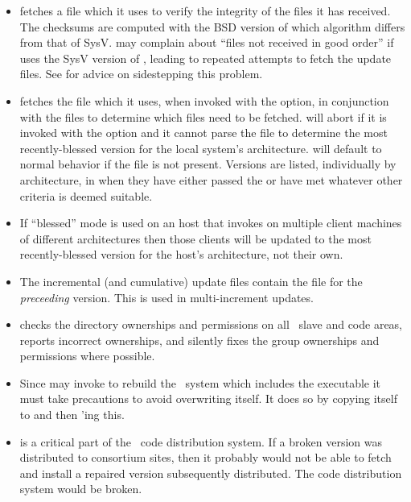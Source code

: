 \begin{itemize}
\item
    fetches a  file which it uses to verify the
   integrity of the files it has received.  The checksums are computed with
   the BSD version of  which algorithm differs from that of SysV.
    may complain about ``files not received in good order'' if 
    uses the SysV version of , leading to repeated
   attempts to fetch the update files.  See 
   for advice on sidestepping this problem.

\item
    fetches the file  which it
   uses, when invoked with the  option, in conjunction with the
    files to determine which files need to be fetched.
    will abort if it is invoked with the  option and
   it cannot parse the  file to determine the most
   recently-blessed version for the local system's architecture.
    will default to normal behavior if the 
   file is not present.  Versions are listed, individually by
   architecture, in  when they have either passed the
    or have met whatever other criteria is deemed
   suitable.

\item
   If ``blessed'' mode is used on an  host that invokes
    on multiple client machines of different
   architectures then those clients will be updated to the most
   recently-blessed version for the  host's architecture,
   not their own.

\item
   The incremental (and cumulative) update files contain the 
   file for the {\em preceeding} version.  This is used in multi-increment
   updates.

\item
    checks the directory ownerships and permissions on all
   \aipspp\ slave and code areas, reports incorrect ownerships, and
   silently fixes the group ownerships and permissions where possible.

\item
   Since  may invoke  to rebuild the \aipspp\ 
   system which includes the  executable it must take precautions
   to avoid overwriting itself.  It does so by copying itself to \exe{inhale-}
   and then \unixexe{exec}'ing this.

\item
    is a critical part of the \aipspp\ code distribution system.
   If a broken version was distributed to consortium sites, then it probably
   would not be able to fetch and install a repaired version subsequently
   distributed.  The code distribution system would be broken.
\end{itemize}

